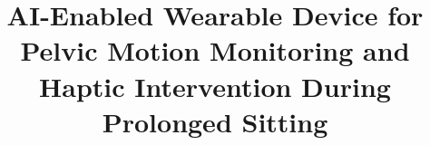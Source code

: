 \documentclass[11pt,a4paper,twocolumn]{report}
\title{AI-Enabled Wearable Device for Pelvic Motion Monitoring and Haptic Intervention During Prolonged Sitting}
\subtitle{}
\begin{document}
\preface

\FloatBarrier

\FloatBarrier

\FloatBarrier

\FloatBarrier





\appendix
\appendixpage


\backcover
\end{document}
